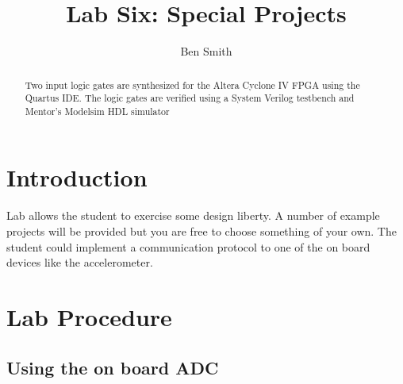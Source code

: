 \newcommand{\TITLE}{Lab Six: Special Projects}
\newcommand{\KEYWORDS}{Logic Gates, Verilog, FPGA, Signaltap, Synthesis}

\title{Lab Six: Special Projects}
\author{Ben Smith}




  \maketitle
    \begin{abstract}
      Two input logic gates are synthesized for the Altera Cyclone IV FPGA using the Quartus IDE. The logic gates are verified using a System Verilog testbench and Mentor's Modelsim HDL simulator
    \end{abstract}

  \section{\bfseries Introduction}
     Lab allows the student to exercise some design liberty. A number of example projects will be provided but you are free to choose something of your own. The student could implement a communication protocol to one of the on board devices like the accelerometer.

  \section{\bfseries Lab Procedure}

    \subsection{Using the on board ADC}
